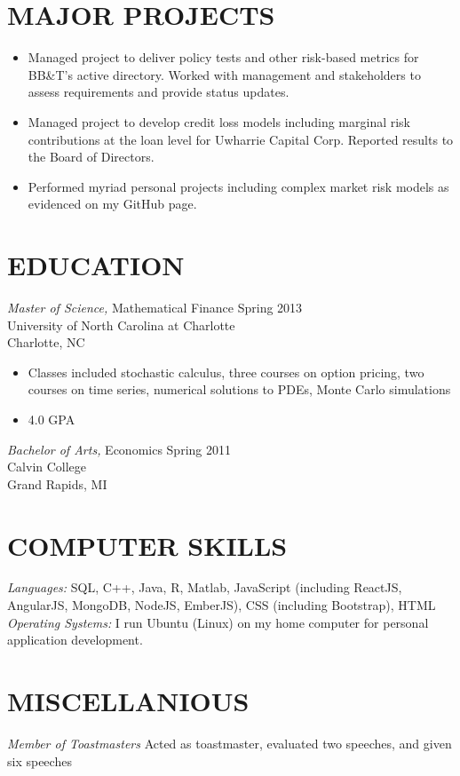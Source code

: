 \documentclass{res}
\begin{document}
\begin{resume}
\section{MAJOR PROJECTS}
\begin{itemize}
\item Managed project to deliver policy tests and other risk-based metrics for BB\&T's active directory.  Worked with management and stakeholders to assess requirements and provide status updates.
\item Managed project to develop credit loss models including marginal risk contributions at the loan level for Uwharrie Capital Corp.  Reported results to the Board of Directors.
\item Performed myriad personal projects including complex market risk models as evidenced on my GitHub page.
\end{itemize}

\section{EDUCATION} {\sl Master of Science,} Mathematical Finance \hfill Spring 2013 \\        
    University of North Carolina at Charlotte  \\ 
    Charlotte, NC 
\begin{itemize}  %
    \item Classes included stochastic calculus, three courses on option pricing, two courses on time series, numerical solutions to PDEs, Monte Carlo simulations
    \item 4.0 GPA
    \end{itemize}
    {\sl Bachelor of Arts,} Economics \hfill Spring 2011 \\ 
    Calvin College\\
    Grand Rapids, MI

\section{COMPUTER SKILLS} {\sl Languages:} SQL, C++, Java, R, Matlab, JavaScript (including ReactJS, AngularJS, MongoDB, NodeJS, EmberJS), CSS (including Bootstrap), HTML\\
{\sl Operating Systems:} I run Ubuntu (Linux) on my home computer for personal application development.

\section{MISCELLANIOUS} {\sl Member of Toastmasters} Acted as toastmaster, evaluated two speeches, and given six speeches

\end{resume}
\end{document}
